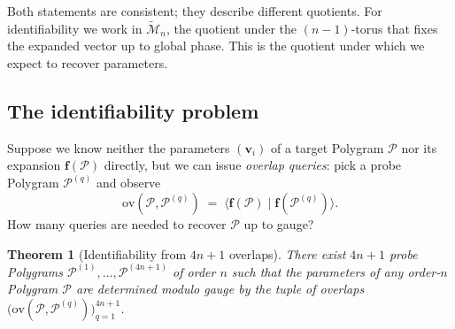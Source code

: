 \documentclass[11pt,letterpaper]{article}
\newtheorem{theorem}{Theorem}[section]
\theoremstyle{definition}
\newcommand{\Polygram}{\mathcal{P}}
\newcommand{\Mset}{\mathcal{M}}
\newcommand{\inner}[2]{\langle #1 \mid #2 \rangle}
\begin{document}
Both statements are consistent; they describe different quotients. For
identifiability we work in $\widetilde{\Mset}_{n}$, the quotient under the
$(n-1)$-torus that fixes the expanded vector up to global phase. This is the
quotient under which we expect to recover parameters.

\subsection{The identifiability problem}

Suppose we know neither the parameters $(\bm{v}_{i})$ of a target Polygram
$\Polygram$ nor its expansion $\bm{f}(\Polygram)$ directly, but we can issue
\emph{overlap queries}: pick a probe Polygram $\Polygram^{(q)}$ and observe
\[
\mathrm{ov}(\Polygram, \Polygram^{(q)}) \;=\; \inner{\bm{f}(\Polygram)}{
\bm{f}(\Polygram^{(q)})}.
\]
How many queries are needed to recover $\Polygram$ up to gauge?

\begin{theorem}[Identifiability from $4n + 1$ overlaps]
\label{thm:identifiability}
There exist $4n + 1$ probe Polygrams $\Polygram^{(1)}, \dots, \Polygram^{(4n+1)}$
of order $n$ such that the parameters of any order-$n$ Polygram $\Polygram$
are determined modulo gauge by the tuple of overlaps
$\big(\mathrm{ov}(\Polygram, \Polygram^{(q)})\big)_{q = 1}^{4n+1}$.
\end{theorem}
\end{document}

